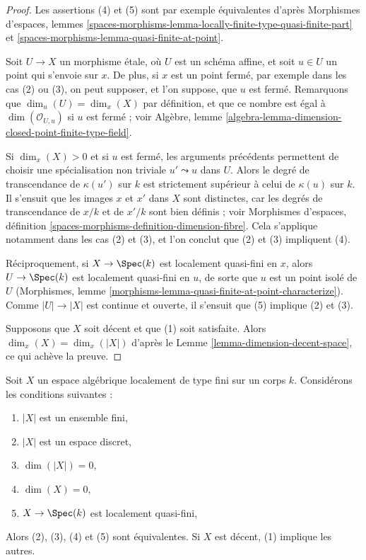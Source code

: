 \begin{proof}
Les assertions (4) et (5) sont par exemple équivalentes d'après
Morphismes d'espaces, lemmes
\ref{spaces-morphisms-lemma-locally-finite-type-quasi-finite-part} et
\ref{spaces-morphisms-lemma-quasi-finite-at-point}.

\medskip\noindent
Soit $U \to X$ un morphisme étale, où $U$ est un schéma affine, et soit
$u \in U$ un point qui s'envoie sur $x$. De plus, si $x$ est un point fermé,
par exemple dans les cas (2) ou (3), on peut supposer, et l'on suppose, que
$u$ est fermé. Remarquons que $\dim_u(U) = \dim_x(X)$ par définition, et que
ce nombre est égal à $\dim(\mathcal{O}_{U, u})$ si $u$ est fermé ; voir
Algèbre, lemme
\ref{algebra-lemma-dimension-closed-point-finite-type-field}.

\medskip\noindent
Si $\dim_x(X) > 0$ et si $u$ est fermé, les arguments précédents permettent de
choisir une spécialisation non triviale $u' \leadsto u$ dans $U$.
Alors le degré de transcendance de $\kappa(u')$ sur $k$ est strictement
supérieur à celui de $\kappa(u)$ sur $k$. Il s'ensuit que les images $x$ et
$x'$ dans $X$ sont distinctes, car les degrés de transcendance de $x/k$ et de
$x'/k$ sont bien définis ; voir Morphismes d'espaces, définition
\ref{spaces-morphisms-definition-dimension-fibre}.
Cela s'applique notamment dans les cas (2) et (3), et l'on conclut que (2) et
(3) impliquent (4).

\medskip\noindent
Réciproquement, si $X \to \Spec(k)$ est localement quasi-fini en $x$, alors
$U \to \Spec(k)$ est localement quasi-fini en $u$, de sorte que $u$ est un
point isolé de $U$
(Morphismes, lemme \ref{morphisms-lemma-quasi-finite-at-point-characterize}).
Comme $|U| \to |X|$ est continue et ouverte, il s'ensuit que (5) implique (2)
et (3).

\medskip\noindent
Supposons que $X$ soit décent et que (1) soit satisfaite. Alors
$\dim_x(X) = \dim_x(|X|)$ d'après le
Lemme \ref{lemma-dimension-decent-space}, ce qui achève la preuve.
\end{proof}

\begin{lemma}
\label{lemma-conditions-on-space-over-field}
Soit $X$ un espace algébrique localement de type fini sur un corps $k$.
Considérons les conditions suivantes :
\begin{enumerate}
\item $|X|$ est un ensemble fini,
\item $|X|$ est un espace discret,
\item $\dim(|X|) = 0$,
\item $\dim(X) = 0$,
\item $X \to \Spec(k)$ est localement quasi-fini,
\end{enumerate}
Alors (2), (3), (4) et (5) sont équivalentes.
Si $X$ est décent, (1) implique les autres.
\end{lemma}


